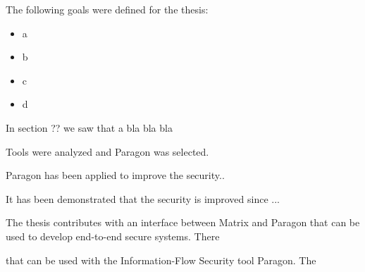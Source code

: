The following goals were defined for the thesis:

\begin{itemize}
	\item a
	\item b
	\item c
	\item d
\end{itemize}

In section ?? we saw that a bla bla bla

Tools were analyzed and Paragon was selected.

Paragon has been applied to improve the security..

It has been demonstrated that the security is improved since ... 

The thesis contributes with an interface between Matrix and Paragon that can be used to develop end-to-end secure systems. There 

  that can be used with the Information-Flow Security tool Paragon. The 